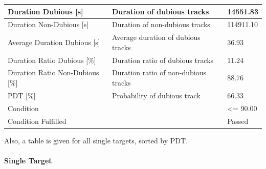 \begin{center}
\begin{table}[H]
\begin{tabularx}{\textwidth}{ | l | X |  l | }
    Duration Dubious [s] & Duration of dubious tracks & 14551.83 \\ \hline
    Duration Non-Dubious [s] & Duration of non-dubious tracks & 114911.10 \\ \hline
    Average Duration Dubious [s] & Average duration of dubious tracks & 36.93 \\ \hline
    Duration Ratio Dubious [\%] & Duration ratio of dubious tracks & 11.24 \\ \hline
    Duration Ratio Non-Dubious [\%] & Duration ratio of non-dubious tracks & 88.76 \\ \hline
    PDT [\%] & Probability of dubious track & 66.33 \\ \hline
    Condition &  & <= 90.00 \\ \hline
    Condition Fulfilled &  & Passed \\ \hline
\end{tabularx}
\end{table}
\end{center}

Also, a table is given for all single targets, sorted by PDT.

\paragraph{Single Target}

